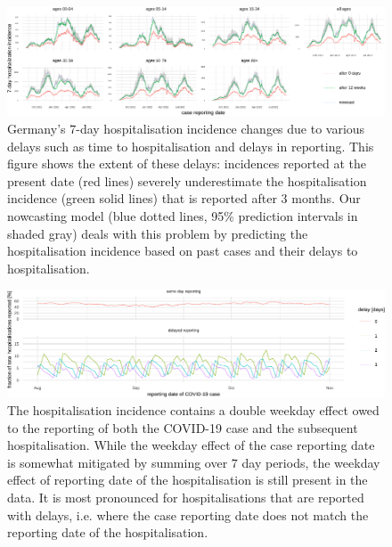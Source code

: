 \begin{figure}

{\centering \includegraphics[width=\textwidth]{figures_tentative/delays_in_reporting-1} 

}

\caption{Germany's $7$-day hospitalisation incidence changes due to various delays such as time to hospitalisation and delays in reporting. This figure shows the extent of these delays: incidences reported at the present date (red lines) severely underestimate the hospitalisation incidence (green solid lines) that is reported after $3$ months. Our nowcasting model (blue dotted lines, 95\% prediction intervals in shaded gray) deals with this problem by predicting the hospitalisation incidence based on past cases and their delays to hospitalisation.}\label{fig:delays_in_reporting}
\end{figure}

\begin{figure}

    {\centering \includegraphics[width=\textwidth]{figures_tentative/double_weekday_effect-1} 

}

\caption{The hospitalisation incidence contains a double weekday effect owed to the reporting of both the COVID-19 case and the subsequent hospitalisation. While the weekday effect of the case reporting date is somewhat mitigated by summing over $7$ day periods, the weekday effect of reporting date of the hospitalisation is still present in the data. It is most pronounced for hospitalisations that are reported with delays, i.e. where the case reporting date does not match the reporting date of the hospitalisation.}\label{fig:double_weekday_effect}
\end{figure}

